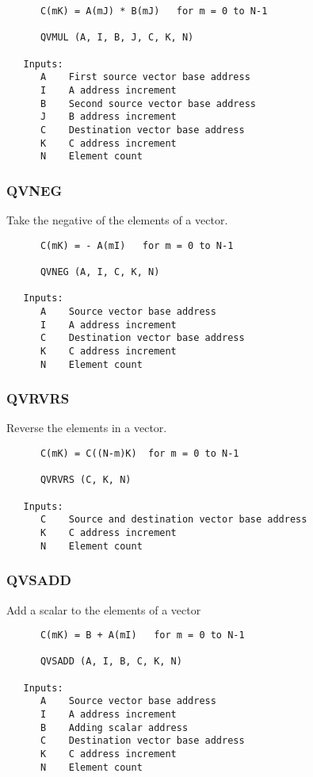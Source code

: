 \begin{verbatim}
      C(mK) = A(mJ) * B(mJ)   for m = 0 to N-1

      QVMUL (A, I, B, J, C, K, N)

   Inputs:
      A    First source vector base address
      I    A address increment
      B    Second source vector base address
      J    B address increment
      C    Destination vector base address
      K    C address increment
      N    Element count

\end{verbatim}
\subsubsection{QVNEG }
Take the negative of the elements of a vector.

\begin{verbatim}
      C(mK) = - A(mI)   for m = 0 to N-1

      QVNEG (A, I, C, K, N)

   Inputs:
      A    Source vector base address
      I    A address increment
      C    Destination vector base address
      K    C address increment
      N    Element count

\end{verbatim}
\subsubsection{QVRVRS }
Reverse the elements in a vector.

\begin{verbatim}
      C(mK) = C((N-m)K)  for m = 0 to N-1

      QVRVRS (C, K, N)

   Inputs:
      C    Source and destination vector base address
      K    C address increment
      N    Element count

\end{verbatim}
\subsubsection{QVSADD }
Add a scalar to the elements of a vector

\begin{verbatim}
      C(mK) = B + A(mI)   for m = 0 to N-1

      QVSADD (A, I, B, C, K, N)

   Inputs:
      A    Source vector base address
      I    A address increment
      B    Adding scalar address
      C    Destination vector base address
      K    C address increment
      N    Element count

\end{verbatim}
